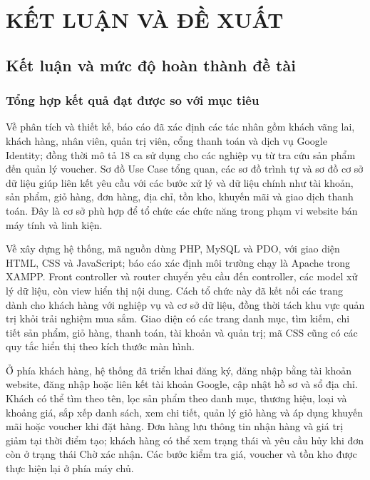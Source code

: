 \chapter{KẾT LUẬN VÀ ĐỀ XUẤT}\label{chap4_intro}
\vspace{-40pt}

\section{Kết luận và mức độ hoàn thành đề tài}

\subsection{Tổng hợp kết quả đạt được so với mục tiêu}

Về phân tích và thiết kế, báo cáo đã xác định các tác nhân gồm khách vãng lai, khách hàng, nhân viên, quản trị viên, cổng thanh toán và dịch vụ Google Identity; đồng thời mô tả 18 ca sử dụng cho các nghiệp vụ từ tra cứu sản phẩm đến quản lý voucher. Sơ đồ Use Case tổng quan, các sơ đồ trình tự và sơ đồ cơ sở dữ liệu giúp liên kết yêu cầu với các bước xử lý và dữ liệu chính như tài khoản, sản phẩm, giỏ hàng, đơn hàng, địa chỉ, tồn kho, khuyến mãi và giao dịch thanh toán. Đây là cơ sở phù hợp để tổ chức các chức năng trong phạm vi website bán máy tính và linh kiện.

Về xây dựng hệ thống, mã nguồn dùng PHP, MySQL và PDO, với giao diện HTML, CSS và JavaScript; báo cáo xác định môi trường chạy là Apache trong XAMPP. Front controller và router chuyển yêu cầu đến controller, các model xử lý dữ liệu, còn view hiển thị nội dung. Cách tổ chức này đã kết nối các trang dành cho khách hàng với nghiệp vụ và cơ sở dữ liệu, đồng thời tách khu vực quản trị khỏi trải nghiệm mua sắm. Giao diện có các trang danh mục, tìm kiếm, chi tiết sản phẩm, giỏ hàng, thanh toán, tài khoản và quản trị; mã CSS cũng có các quy tắc hiển thị theo kích thước màn hình.

Ở phía khách hàng, hệ thống đã triển khai đăng ký, đăng nhập bằng tài khoản website, đăng nhập hoặc liên kết tài khoản Google, cập nhật hồ sơ và sổ địa chỉ. Khách có thể tìm theo tên, lọc sản phẩm theo danh mục, thương hiệu, loại và khoảng giá, sắp xếp danh sách, xem chi tiết, quản lý giỏ hàng và áp dụng khuyến mãi hoặc voucher khi đặt hàng. Đơn hàng lưu thông tin nhận hàng và giá trị giảm tại thời điểm tạo; khách hàng có thể xem trạng thái và yêu cầu hủy khi đơn còn ở trạng thái Chờ xác nhận. Các bước kiểm tra giá, voucher và tồn kho được thực hiện lại ở phía máy chủ.

